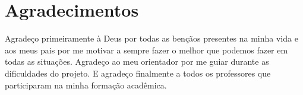 \chapter*{Agradecimentos}
\thispagestyle{empty}

Agradeço primeiramente à Deus por todas as bençãos presentes na minha vida e aos meus pais por me motivar a sempre fazer o melhor que podemos fazer em todas as situações. Agradeço ao meu orientador por me guiar durante as dificuldades do projeto. E agradeço finalmente a todos os professores que participaram na minha formação acadêmica.